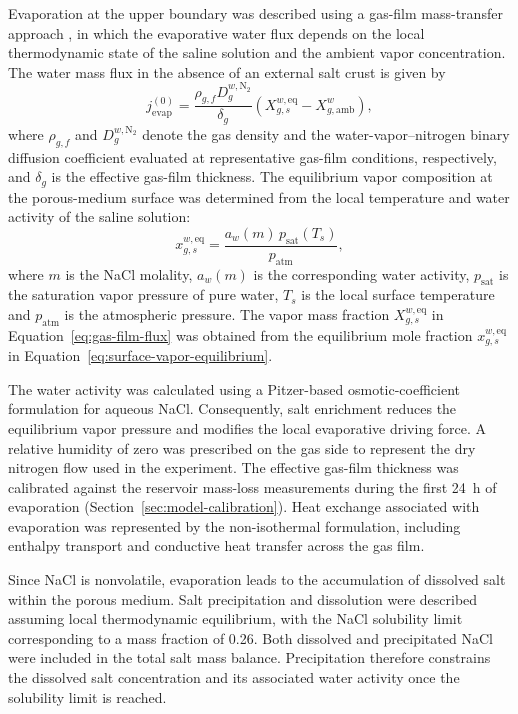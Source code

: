 \documentclass[final]{agujournal2019}
\begin{document}
Evaporation at the upper boundary was described using a gas-film mass-transfer
approach \cite{mosthaf2014,vanderborght2017,fetzer2017}, in which the evaporative
water flux depends on the local thermodynamic state of the saline solution and
the ambient vapor concentration. The water mass flux in the absence of an
external salt crust is given by
\begin{equation}
j_{\mathrm{evap}}^{(0)} =
\frac{\rho_{g,f}D_g^{w,\mathrm{N_2}}}{\delta_g}
\left(X_{g,s}^{w,\mathrm{eq}}-X_{g,\mathrm{amb}}^{w}\right),
\label{eq:gas-film-flux}
\end{equation}
where $\rho_{g,f}$ and $D_g^{w,\mathrm{N_2}}$ denote the gas density and the
water-vapor--nitrogen binary diffusion coefficient evaluated at representative
gas-film conditions, respectively, and $\delta_g$ is the effective gas-film
thickness. The equilibrium vapor
composition at the porous-medium surface was determined from the local
temperature and water activity of the saline solution:
\begin{equation}
x_{g,s}^{w,\mathrm{eq}} =
\frac{a_w(m)\,p_{\mathrm{sat}}(T_s)}{p_{\mathrm{atm}}},
\label{eq:surface-vapor-equilibrium}
\end{equation}
where $m$ is the NaCl molality, $a_w(m)$ is the corresponding water activity,
$p_{\mathrm{sat}}$ is the saturation vapor pressure of pure water, $T_s$ is the
local surface temperature and $p_{\mathrm{atm}}$ is the atmospheric pressure.
The vapor mass fraction $X_{g,s}^{w,\mathrm{eq}}$ in
Equation~\ref{eq:gas-film-flux} was obtained from the equilibrium mole fraction
$x_{g,s}^{w,\mathrm{eq}}$ in
Equation~\ref{eq:surface-vapor-equilibrium}.

The water activity was calculated using a Pitzer-based osmotic-coefficient
formulation for aqueous NaCl. Consequently, salt enrichment reduces the
equilibrium vapor pressure and modifies the local evaporative driving force. A
relative humidity of zero was prescribed on the gas side to represent the dry
nitrogen flow used in the experiment. The effective gas-film thickness was
calibrated against the reservoir mass-loss measurements during the first 24~h
of evaporation (Section~\ref{sec:model-calibration}). Heat exchange associated
with evaporation was represented by the non-isothermal formulation, including
enthalpy transport and conductive heat transfer across the gas film.

Since NaCl is nonvolatile, evaporation leads to the accumulation of dissolved
salt within the porous medium. Salt precipitation and dissolution were
described assuming local thermodynamic equilibrium, with the NaCl solubility
limit corresponding to a mass fraction of 0.26. Both dissolved and precipitated
NaCl were included in the total salt mass balance. Precipitation therefore
constrains the dissolved salt concentration and its associated water activity
once the solubility limit is reached.
\end{document}
